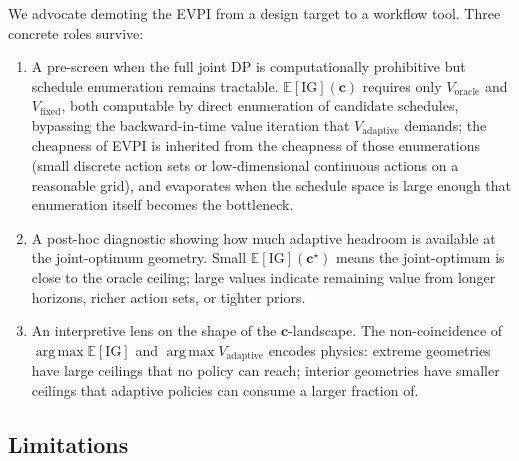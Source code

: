 \documentclass[11pt,a4paper,onecolumn]{article}
\newcommand{\E}{\mathbb{E}}
\newcommand{\argmax}{\operatorname*{arg\,max}}
\newcommand{\bc}{\bm{c}}
\begin{document}
We advocate demoting the EVPI from a design target to a workflow tool.  Three concrete roles survive:
\begin{enumerate}[nosep]
\item A pre-screen when the full joint DP is computationally prohibitive but schedule enumeration remains tractable.  $\E[\mathrm{IG}](\bc)$ requires only $V_{\text{oracle}}$ and $V_{\text{fixed}}$, both computable by direct enumeration of candidate schedules, bypassing the backward-in-time value iteration that $V_{\text{adaptive}}$ demands; the cheapness of EVPI is inherited from the cheapness of those enumerations (small discrete action sets or low-dimensional continuous actions on a reasonable grid), and evaporates when the schedule space is large enough that enumeration itself becomes the bottleneck.
\item A post-hoc diagnostic showing how much adaptive headroom is available at the joint-optimum geometry.  Small $\E[\mathrm{IG}](\bc^\star)$ means the joint-optimum is close to the oracle ceiling; large values indicate remaining value from longer horizons, richer action sets, or tighter priors.
\item An interpretive lens on the shape of the $\bc$-landscape.  The non-coincidence of $\argmax \E[\mathrm{IG}]$ and $\argmax V_{\text{adaptive}}$ encodes physics: extreme geometries have large ceilings that no policy can reach; interior geometries have smaller ceilings that adaptive policies can consume a larger fraction of.
\end{enumerate}

\subsection{Limitations}
\end{document}
